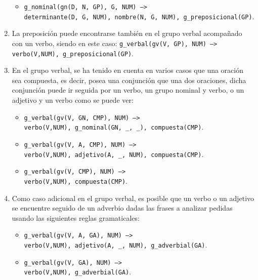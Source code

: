\documentclass[a4paper]{article}
\begin{document}
\begin{enumerate}
\begin{itemize}
                \item \texttt{g\_nominal(gn(D, N, GP), G, NUM) -->\\ determinante(D, G, NUM), nombre(N, G, NUM), g\_preposicional(GP)}.

            \end{itemize}

        \item La preposición puede encontrarse también en el grupo verbal acompañado con un verbo, siendo en este caso: \texttt{g\_verbal(gv(V, GP), NUM) --> verbo(V,NUM), g\_preposicional(GP)}.

        \item En el grupo verbal, se ha tenido en cuenta en varios casos que una oración sea compuesta, es decir, posea una conjunción que una dos oraciones, dicha conjunción puede ir seguida por un verbo, un grupo nominal y verbo, o un adjetivo y un verbo como se puede ver:

            \begin{itemize}

                \item \texttt{g\_verbal(gv(V, GN, CMP), NUM) -->\\ verbo(V,NUM), g\_nominal(GN, \_, \_), compuesta(CMP)}.

                \item \texttt{g\_verbal(gv(V, A, CMP), NUM) -->\\ verbo(V,NUM), adjetivo(A, \_, NUM), compuesta(CMP)}.

                \item \texttt{g\_verbal(gv(V, CMP), NUM) -->\\ verbo(V,NUM), compuesta(CMP)}.

            \end{itemize}

        \item Como caso adicional en el grupo verbal, es posible que un verbo o un adjetivo se encuentre seguido de un adverbio dadas las frases a analizar pedidas usando las siguientes reglas gramaticales:

            \begin{itemize}

                \item \texttt{g\_verbal(gv(V, A, GA), NUM) -->\\ verbo(V,NUM), adjetivo(A, \_, NUM), g\_adverbial(GA)}.

                \item \texttt{g\_verbal(gv(V, GA), NUM) -->\\ verbo(V,NUM), g\_adverbial(GA)}.


\end{itemize}
\end{enumerate}
\end{document}

